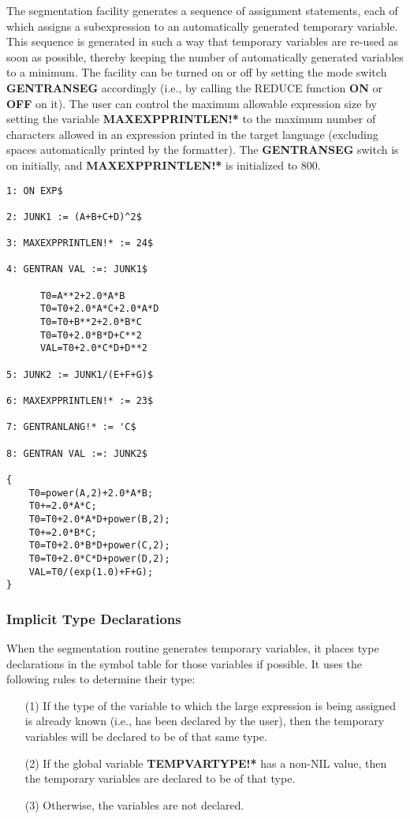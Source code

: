 The segmentation facility generates a sequence of assignment
statements, each of which assigns a subexpression to an automatically
generated temporary variable.  This sequence is generated in such a
way that temporary variables are re-used as soon as possible, thereby
keeping the number of automatically generated variables to a minimum.
The facility can be turned on or off by setting the mode
 switch {\bf GENTRANSEG} accordingly (i.e.,
by calling the REDUCE function {\bf ON} or {\bf OFF} on it).  The user
can control the maximum allowable expression size by setting the
variable {\bf MAXEXPPRINTLEN!*} to the maximum number of characters
allowed in an expression printed in the target language (excluding
spaces automatically printed by the formatter).  The {\bf GENTRANSEG}
switch is on initially, and {\bf MAXEXPPRINTLEN!*} is initialized to
800.
\begin{describe}{\example}
\begin{verbatim}
1: ON EXP$ 

2: JUNK1 := (A+B+C+D)^2$ 

3: MAXEXPPRINTLEN!* := 24$ 

4: GENTRAN VAL :=: JUNK1$ 

      T0=A**2+2.0*A*B
      T0=T0+2.0*A*C+2.0*A*D
      T0=T0+B**2+2.0*B*C
      T0=T0+2.0*B*D+C**2
      VAL=T0+2.0*C*D+D**2

5: JUNK2 := JUNK1/(E+F+G)$ 

6: MAXEXPPRINTLEN!* := 23$ 

7: GENTRANLANG!* := 'C$ 

8: GENTRAN VAL :=: JUNK2$ 

{
    T0=power(A,2)+2.0*A*B;
    T0+=2.0*A*C;
    T0=T0+2.0*A*D+power(B,2);
    T0+=2.0*B*C;
    T0=T0+2.0*B*D+power(C,2);
    T0=T0+2.0*C*D+power(D,2);
    VAL=T0/(exp(1.0)+F+G);
}
\end{verbatim}
\end{describe}
\subsubsection{Implicit Type Declarations}\label{GENTRAN:itd}
When the segmentation routine generates temporary variables, it places
type declarations in the symbol table for those variables if
possible.  It uses the following rules to determine their type:
 
\begin{itemize}
\item[{(1)}]
If the type of the variable to which the large expression is being
assigned is already known (i.e., has been declared by the user),
then the temporary variables will be declared to be of that same type.
\item[{(2)}] 
If the global variable {\bf TEMPVARTYPE!*} has a non-NIL value, then the
temporary variables are declared to be of that type.
\item[{(3)}]
Otherwise, the variables are not declared.
\end{itemize}

